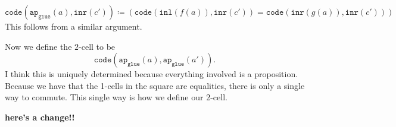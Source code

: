 \documentclass[11pt]{amsart}
\newcommand{\type}[1]{\mathtt{#1}}
\begin{document}
\vspace{2em}

$ 
\type{ code } \left( \type{ ap }_{ \type{ glue } } ( a ) , \type{ inr } ( c' ) \right) \coloneqq 
	\left( 
		\type{ code } ( \type{ inl } ( f ( a ) ) , \type{ inr } ( c' ) ) =
		\type{ code } ( \type{ inr } ( g ( a ) ) , \type{ inr } ( c' ) ) 
	\right) 
$ 
This follows from a similar argument.

\vspace{2em}

Now we define the $2$-cell to be
\[
	\type{ code } ( \type{ ap }_\type{ glue } ( a ) , \type{ ap }_\type{ glue } ( a' )  ) .
\]
I think this is uniquely determined because
everything involved is a proposition. 
Because we have that the 1-cells 
in the square are equalities,
there is only a single way to commute.
This single way is how we define our 2-cell. 

\textbf{here's a change!!}



\end{document}
